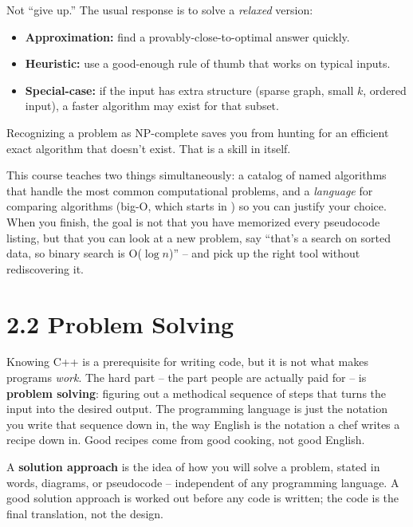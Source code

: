 \documentclass[11pt]{article}
\begin{document}
\begin{ideabox}
Not ``give up.'' The usual response is to solve a \emph{relaxed}
version:
\begin{itemize}[leftmargin=*,noitemsep]
    \item \textbf{Approximation:} find a provably-close-to-optimal
          answer quickly.
    \item \textbf{Heuristic:} use a good-enough rule of thumb that
          works on typical inputs.
    \item \textbf{Special-case:} if the input has extra structure
          (sparse graph, small $k$, ordered input), a faster algorithm
          may exist for that subset.
\end{itemize}
Recognizing a problem as NP-complete saves you from hunting for an
efficient exact algorithm that doesn't exist. That is a skill in
itself.
\end{ideabox}

\begin{ideabox}
This course teaches two things simultaneously: a catalog of named
algorithms that handle the most common computational problems, and a
\emph{language} for comparing algorithms (big-O, which starts in
) so you can justify your choice. When you finish, the
goal is not that you have memorized every pseudocode listing, but
that you can look at a new problem, say ``that's a search on sorted
data, so binary search is O($\log n$)'' -- and pick up the right tool
without rediscovering it.
\end{ideabox}

\section{2.2 Problem Solving}

Knowing C++ is a prerequisite for writing code, but it is not what
makes programs \emph{work}. The hard part -- the part people are
actually paid for -- is \textbf{problem solving}: figuring out a
methodical sequence of steps that turns the input into the desired
output. The programming language is just the notation you write that
sequence down in, the way English is the notation a chef writes a
recipe down in. Good recipes come from good cooking, not good English.

\begin{defnbox}
A \textbf{solution approach} is the idea of how you will solve a
problem, stated in words, diagrams, or pseudocode -- independent of
any programming language. A good solution approach is worked out
before any code is written; the code is the final translation, not
the design.
\end{defnbox}
\end{document}
